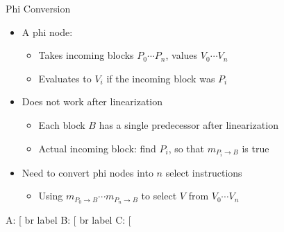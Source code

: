 \begin{frame}[fragile]{Phi Conversion}

\begin{itemize}
    \item A phi node:
    \begin{itemize}
        \item Takes incoming blocks $P_0 \cdots P_n$, values $V_0 \cdots V_n$
        \item Evaluates to $V_i$ if the incoming block was $P_i$
    \end{itemize}
    \item Does not work after linearization
    \begin{itemize}
        \item Each block $B$ has a single predecessor after linearization
        \item Actual incoming block: find $P_i$, so that $m_{P_i \rightarrow B}$ is true
    \end{itemize}
    \item Need to convert phi nodes into $n$ select instructions
    \begin{itemize}
        \item Using $m_{P_0 \rightarrow B} \cdots m_{P_n \rightarrow B}$ to select $V$ from $V_0 \cdots V_n$
    \end{itemize}
\end{itemize}

\hspace{3.0em}\begin{minipage}[t]{0.38\linewidth}


\begin{codebox}[commandchars=\\\[\]]
A:
  \varying[%
  br label %
B:
  \varying[%
  br label %
C:
  \varying[%
\end{codebox}

\end{minipage}

\end{frame}

